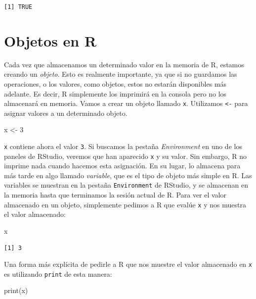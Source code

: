 \documentclass[
  letterpaper,
  DIV=11,
  numbers=noendperiod]{scrreprt}
\newenvironment{Shaded}{\begin{snugshade}}{\end{snugshade}}
\newcommand{\DecValTok}[1]{\textcolor[rgb]{0.68,0.00,0.00}{#1}}
\newcommand{\FunctionTok}[1]{\textcolor[rgb]{0.28,0.35,0.67}{#1}}
\newcommand{\NormalTok}[1]{\textcolor[rgb]{0.00,0.23,0.31}{#1}}
\newcommand{\OtherTok}[1]{\textcolor[rgb]{0.00,0.23,0.31}{#1}}
\begin{document}
\begin{verbatim}
[1] TRUE
\end{verbatim}

\hypertarget{objetos-en-r}{%
\section{Objetos en R}\label{objetos-en-r}}

Cada vez que almacenamos un determinado valor en la memoria de R,
estamos creando un \emph{objeto}. Esto es realmente importante, ya que
si no guardamos las operaciones, o los valores, como objetos, estos no
estarán disponibles más adelante. Es decir, R simplemente los imprimirá
en la consola pero no los almacenará en memoria. Vamos a crear un objeto
llamado \texttt{x}. Utilizamos \texttt{\textless{}-} para asignar
valores a un determinado objeto.

\begin{Shaded}
\begin{Highlighting}[]
\NormalTok{x }\OtherTok{\textless{}{-}} \DecValTok{3}
\end{Highlighting}
\end{Shaded}

\texttt{x} contiene ahora el valor \texttt{3}. Si buscamos la pestaña
\emph{Environment} en uno de los paneles de RStudio, veremos que han
aparecido \texttt{x} y su valor. Sin embargo, R no imprime nada cuando
hacemos esta asignación. En su lugar, lo almacena para más tarde en algo
llamado \emph{variable}, que es el tipo de objeto más simple en R. Las
variables se muestran en la pestaña \texttt{Environment} de RStudio, y
se almacenan en la memoria hasta que terminamos la sesión actual de R.
Para ver el valor almacenado en un objeto, simplemente pedimos a R que
evalúe \texttt{x} y nos muestra el valor almacenado:

\begin{Shaded}
\begin{Highlighting}[]
\NormalTok{x}
\end{Highlighting}
\end{Shaded}

\begin{verbatim}
[1] 3
\end{verbatim}

Una forma más explícita de pedirle a R que nos muestre el valor
almacenado en \texttt{x} es utilizando \texttt{print} de esta manera:

\begin{Shaded}
\begin{Highlighting}[]
\FunctionTok{print}\NormalTok{(x)}
\end{Highlighting}
\end{Shaded}
\end{document}
